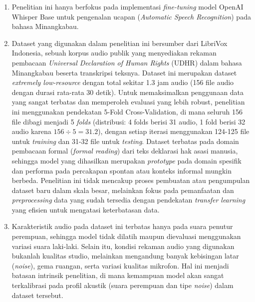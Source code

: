 \begin{enumerate}
    \item Penelitian ini hanya berfokus pada implementasi \textit{fine-tuning} model OpenAI Whisper Base untuk pengenalan ucapan (\textit{Automatic Speech Recognition}) pada bahasa Minangkabau.
    
    \item Dataset yang digunakan dalam penelitian ini bersumber dari LibriVox Indonesia, sebuah korpus audio publik yang menyediakan rekaman pembacaan \textit{Universal Declaration of Human Rights} (UDHR) dalam bahasa Minangkabau beserta transkripsi teksnya. Dataset ini merupakan dataset \textit{extremely low-resource} dengan total sekitar 1.3 jam audio (156 file audio dengan durasi rata-rata 30 detik). Untuk memaksimalkan penggunaan data yang sangat terbatas dan memperoleh evaluasi yang lebih robust, penelitian ini menggunakan pendekatan 5-Fold Cross-Validation, di mana seluruh 156 file dibagi menjadi 5 \textit{folds} (distribusi: 4 folds berisi 31 audio, 1 fold berisi 32 audio karena $156 \div 5 = 31.2$), dengan setiap iterasi menggunakan 124-125 file untuk \textit{training} dan 31-32 file untuk \textit{testing}. Dataset terbatas pada domain pembacaan formal (\textit{formal reading}) dari teks deklarasi hak asasi manusia, sehingga model yang dihasilkan merupakan \textit{prototype} pada domain spesifik dan performa pada percakapan spontan atau konteks informal mungkin berbeda. Penelitian ini tidak mencakup proses pembuatan atau pengumpulan dataset baru dalam skala besar, melainkan fokus pada pemanfaatan dan \textit{preprocessing} data yang sudah tersedia dengan pendekatan \textit{transfer learning} yang efisien untuk mengatasi keterbatasan data.
    
    \item Karakteristik audio pada dataset ini terbatas hanya pada suara penutur perempuan, sehingga model tidak dilatih maupun dievaluasi menggunakan variasi suara laki-laki. Selain itu, kondisi rekaman audio yang digunakan bukanlah kualitas studio, melainkan mengandung banyak kebisingan latar (\textit{noise}), gema ruangan, serta variasi kualitas mikrofon. Hal ini menjadi batasan intrinsik penelitian, di mana kemampuan model akan sangat terkalibrasi pada profil akustik (suara perempuan dan tipe \textit{noise}) dalam dataset tersebut.


\end{enumerate}
